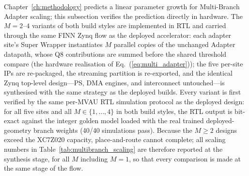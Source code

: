 \documentclass[12pt, a4paper]{report}
\numberwithin{equation}{chapter}
\numberwithin{figure}{chapter}
\numberwithin{table}{chapter}
\numberwithin{algorithm}{chapter}
\begin{document}
Chapter~\ref{ch:methodology} predicts a linear parameter growth for Multi-Branch Adapter scaling; this subsection verifies the prediction directly in hardware. The $M{=}2$--$4$ variants of both build styles are implemented in RTL and carried through the same FINN Zynq flow as the deployed accelerator: each adapter site's Super Wrapper instantiates $M$ parallel copies of the unchanged Adapter datapath, whose Q8 contributions are summed before the shared threshold compare (the hardware realisation of Eq.~(\ref{eq:multi_adapter})); the five per-site IPs are re-packaged, the streaming partition is re-exported, and the identical Zynq top-level design---PS, DMA engines, and interconnect untouched---is synthesised with the same strategy as the deployed builds. Every variant is first verified by the same per-MVAU RTL simulation protocol as the deployed design: for all five sites and all $M \in \{1,\dots,4\}$ in both build styles, the RTL output is bit-exact against the integer golden model loaded with the real trained deployed-geometry branch weights (40/40 simulations pass). Because the $M \geq 2$ designs exceed the XC7Z020 capacity, place-and-route cannot complete; all scaling numbers in Table~\ref{tab:multibranch_scaling} are therefore reported at the synthesis stage, for all $M$ including $M{=}1$, so that every comparison is made at the same stage of the flow.
\end{document}
